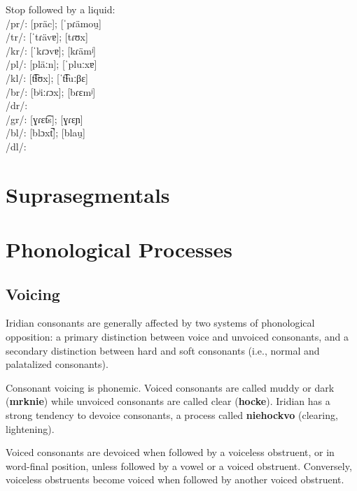 \pex
\a Stop followed by a liquid:\\
/pr/:  [pr\"ac];  [ˈpɾämou̯]\\
/tr/:  [ˈtɾävɐ];  [tɾʊx]\\
/kr/:  [ˈkɾɔvɐ];  [kɾämʲ]\\
/pl/:  [pläːn];  [ˈpluːxɐ]\\
/kl/:  [t͡ɬʊx];  [ˈt͡ɬuːβɛ]\\
/br/:  [bʲiːɾɔx];  [bɾɛmʲ]\\
/dr/: \\
/gr/:  [ɣɾɛt͡s];  [ɣɾɛɲ]\\
/bl/:  [blɔxt̚];  [blau̯]\\
/dl/:
\xe

\section{Suprasegmentals}


\section{Phonological Processes}

\subsection{Voicing}
\par Iridian consonants are generally affected by two systems of phonological opposition: a primary distinction between voice and unvoiced consonants, and a secondary distinction between hard and soft consonants (i.e., normal and palatalized consonants).
\par Consonant voicing is phonemic. Voiced consonants are called muddy or dark (\textbf{mrknie}) while unvoiced consonants are called clear (\textbf{hocke}). Iridian has a strong tendency to devoice consonants, a process called \textbf{niehockvo} (clearing, lightening).

\par Voiced consonants are devoiced when followed by a voiceless obstruent, or in word-final position, unless followed by a vowel or a voiced obstruent. Conversely, voiceless obstruents become voiced when followed by another voiced obstruent.


